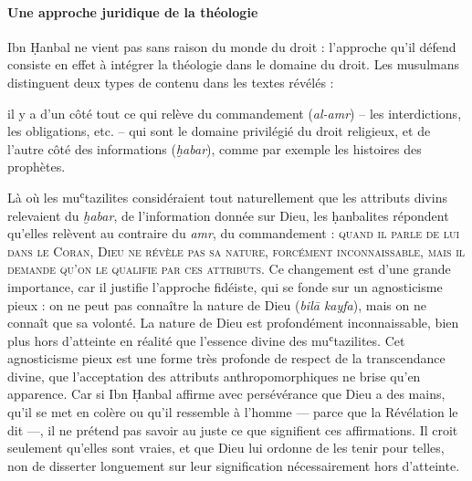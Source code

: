 \paragraph{Une approche juridique de la théologie} Ibn Ḥanbal ne vient pas sans raison du monde du droit : l'approche qu'il
défend consiste en effet à intégrer la théologie dans le domaine du
droit. Les musulmans distinguent deux types de contenu dans les textes
révélés : 
\begin{Def}[al-amr]
il y a d'un côté tout ce qui relève du commandement
(\emph{al-amr}) -- les interdictions, les obligations, etc. -- qui sont
le domaine privilégié du droit religieux, et de l'autre côté des
informations (\emph{ḫabar}), comme par exemple les histoires des
prophètes.
\end{Def}  
Là où les muʿtazilites considéraient tout naturellement que
les attributs divins relevaient du \emph{ḫabar}, de l'information donnée
sur Dieu, les ḥanbalites répondent qu'elles relèvent au contraire du
\emph{amr}, du commandement : \textsc{quand il parle de lui dans le Coran, Dieu
ne révèle pas sa nature, forcément inconnaissable, mais il demande qu'on
le qualifie par ces attributs. }Ce changement est d'une grande
importance, car il justifie l'approche fidéiste, qui se fonde sur un
agnosticisme pieux : on ne peut pas connaître la nature de Dieu
(\emph{bilā kayfa}), mais on ne connaît que sa volonté. La nature de
Dieu est profondément inconnaissable, bien plus hors d'atteinte en
réalité que l'essence divine des muʿtazilites. Cet agnosticisme pieux
est une forme très profonde de respect de la transcendance divine, que
l'acceptation des attributs anthropomorphiques ne brise qu'en apparence.
Car si Ibn Ḥanbal affirme avec
persévérance que Dieu a des mains, qu'il se met en colère ou qu'il
ressemble à l'homme --- parce que la Révélation le dit ---, il ne
prétend pas savoir au juste ce que signifient ces affirmations. Il croit
seulement qu'elles sont vraies, et que Dieu lui ordonne de les tenir
pour telles, non de disserter longuement sur leur signification
nécessairement hors d'atteinte.


